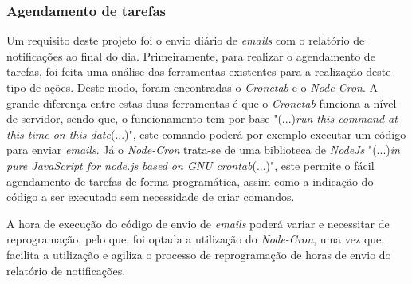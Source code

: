 \subsubsection{Agendamento de tarefas}

Um requisito deste projeto foi o envio diário de \textit{emails} com o relatório de notificações ao final do dia. Primeiramente, para realizar o agendamento de tarefas, foi feita uma análise das ferramentas existentes para a realização deste tipo de ações. Deste modo, foram encontradas o \textit{Cronetab} e o \textit{Node-Cron}. A grande diferença entre estas duas ferramentas é que o \textit{Cronetab} funciona a nível de servidor, sendo que, o funcionamento tem por base "(...)\emph{run this command at this time
on this date}(...)"\citep{crontab}, este comando poderá por exemplo executar um código para enviar \textit{emails}. Já o \textit{Node-Cron} trata-se de uma biblioteca de \textit{NodeJs} "(...)\emph{in pure JavaScript for node.js based on GNU crontab}(...)"\citep{node_cron}, este permite o fácil agendamento de tarefas de forma programática, assim como a indicação do código a ser executado sem necessidade de criar comandos.

A hora de execução do código de envio de \textit{emails} poderá variar e necessitar de reprogramação, pelo que, foi optada a utilização do \textit{Node-Cron}, uma vez que, facilita a utilização e agiliza o processo de reprogramação de horas de envio do relatório de notificações.